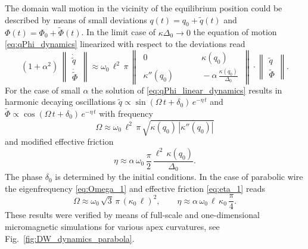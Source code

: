 The domain wall motion in the vicinity of the equilibrium position could be described by means of small deviations $q(t) = q_0 + \tilde{q}(t)$ and $\Phi(t) = \Phi_0 + \tilde{\Phi}(t)$. In the limit case of $\kappa \Delta_0 \rightarrow 0$ the equation of motion \eqref{eq:qPhi_dynamics} linearized with respect to the deviations read~\cite{Yershov15b}
\begin{equation} \label{eq:qPhi_linear_dynamics}
	(1+\alpha^2) \, \begin{Vmatrix*} \dot{\tilde{q}} \\ \dot{\tilde{\Phi}} \end{Vmatrix*} \approx \omega_0 \, \ell^2 \, \pi \, \begin{Vmatrix*} \, 0 \qquad	& \, \, \, \kappa(q_0) \, \\
	\, \kappa''(q_0) \qquad	& \, \, \, - \alpha \, \frac{\kappa(q_0)}{\Delta_0} \, \end{Vmatrix*} \cdot \begin{Vmatrix*} \tilde{q} \\ \tilde{\Phi} \end{Vmatrix*}.
\end{equation}
For the case of small $\alpha$ the solution of \eqref{eq:qPhi_linear_dynamics} results in harmonic decaying oscillations $\tilde{q} \propto \sin(\Omega \, t + \delta_0) \, e^{-\eta \, t}$ and $\tilde{\Phi} \propto \cos(\Omega \, t + \delta_0) \, e^{-\eta \, t}$ with frequency~\cite{Yershov15b}
\begin{equation} \label{eq:Omega_1}
	\Omega \approx \omega_0 \, \ell^2 \, \pi \, \sqrt{\kappa(q_0) \, |\kappa''(q_0)|}
\end{equation}
and modified effective friction 
\begin{equation} \label{eq:eta_1}
	\eta \approx \alpha \, \omega_0 \, \dfrac{\pi}{2} \, \dfrac{\ell^2 \, \kappa(q_0)}{\Delta_0}.
\end{equation}
The phase $\delta_0$ is determined by the initial conditions. In the case of parabolic wire the eigenfrequency \eqref{eq:Omega_1} and effective friction \eqref{eq:eta_1} reads~\cite{Yershov15b}
\begin{equation} \label{eq:Omega_eta_2}
	\Omega \approx \omega_0 \, \sqrt{3} \, \pi \, (\kappa_0 \, \ell)^2, \qquad \eta \approx \alpha \, \omega_0 \, \ell \, \kappa_0 \, \dfrac{\pi}{4}.
\end{equation}
These results were verified by means of full-scale and one-dimensional micromagnetic simulations for various apex curvatures, see Fig.~\ref{fig:DW_dynamics_parabola}.

